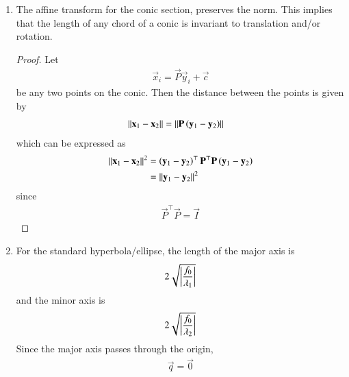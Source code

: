 \begin{enumerate}[label=\thesubsection.\arabic*.,ref=\thesubsection.\theenumi]
\begin{proof}
The distance between the points in 
	\eqref{eq:app-chord-pts}
is given by 
\begin{align}
	\norm{\vec{x}_1-\vec{x}_2} =  \abs{\kappa_1-\kappa_2} \norm{\vec{m}}
\label{eq:app-conic_tangent_pts_dist}
\end{align}
Substituing $\kappa_i$ from 
\eqref{eq:app-tangent_roots} in
\eqref{eq:app-conic_tangent_pts_dist}
yields
	\eqref{eq:chord-len}.
\end{proof}
	\item
 The affine transform for the conic section, preserves the norm.  This implies that the length of any chord of a conic
	is invariant to translation and/or rotation.
	
	\begin{proof}
	Let 
\begin{align}
\vec{x}_i = \vec{P}\vec{y}_i+\vec{c} 
\label{eq:conic_affine_pts}
\end{align}
be any two points on the conic.  Then the distance between the points is given by 
\begin{align}
	\left\lVert\mathbf{x}_1-\mathbf{x}_2 \right\rVert &= \left\lVert\mathbf{P}\left(	\mathbf{y}_1 -\mathbf{y}_2 \right)\right\rVert
\end{align}
which can be expressed as 
\begin{align}
	\left\lVert\mathbf{x}_1-\mathbf{x}_2 \right\rVert^2 &= 		\left(\mathbf{y}_1 -\mathbf{y}_2 \right)^{\top}\mathbf{P}^{\top}\mathbf{P}\left(\mathbf{y}_1 -\mathbf{y}_2 \right)
	\\
	&= 		\left\lVert\mathbf{y}_1 -\mathbf{y}_2 \right\rVert^2
\label{eq:conic_affine_norm_preserve}
\end{align}
since 
\begin{align}
	\vec{P}^{\top}\vec{P} = \vec{I}
\end{align}
	\end{proof}
    \item For the standard hyperbola/ellipse, the length of the major axis is 
  \begin{align}
\label{eq:app-chord-len-major}
 2\sqrt{\left\vert\frac{
f_0}
{\lambda_1}
	  \right\vert}
  \end{align}
  and the minor axis is 
  \begin{align}
\label{eq:app-chord-len-minor}
 2\sqrt{\left\vert\frac{
f_0}
{\lambda_2}
	  \right\vert}
  \end{align}
		\label{app:major}
		\solution
		Since the major axis passes through the origin, 
  \begin{align}
	  \vec{q} =			\vec{0} 
\end{align}  

\end{enumerate}
